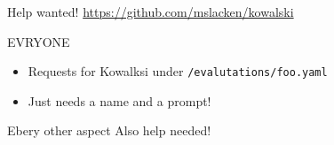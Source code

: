 \documentclass[aspectratio=169]{beamer}
\begin{document}
\begin{frame}{Help wanted!}
\href{https://github.com/mslacken/kowalski}{https://github.com/mslacken/kowalski}
\begin{block}{EVRYONE}
\begin{itemize}
  \item Requests for Kowalksi under \texttt{/evalutations/foo.yaml}
  \item Just needs a name and a prompt!
\end{itemize}
\end{block}
\begin{block}{Ebery other aspect}
Also help needed!
\end{block}
\end{frame}
\end{document}
